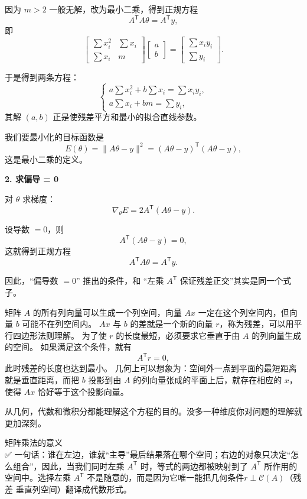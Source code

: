 因为 $m>2$ 一般无解，改为最小二乘，得到正规方程
\[
A^{\mathsf T}A\theta=A^{\mathsf T}y,
\]
即
\[
\begin{bmatrix}
\sum x_i^2 & \sum x_i \\
\sum x_i   & m
\end{bmatrix}
\begin{bmatrix}
a \\ b
\end{bmatrix}
=
\begin{bmatrix}
\sum x_i y_i \\
\sum y_i
\end{bmatrix}.
\]

于是得到两条方程：
\[
\begin{cases}
a\sum x_i^2 + b\sum x_i = \sum x_i y_i, \\[6pt]
a\sum x_i + b m = \sum y_i ,
\end{cases}
\]
其解 $(a,b)$ 正是使残差平方和最小的拟合直线参数。
\begin{proposition}[从矩阵理解和从导数理解的关系]
    我们要最小化的目标函数是
\[
E(\theta) = \|A\theta - y\|^2 = (A\theta - y)^{\mathsf T}(A\theta - y),
\]
这是最小二乘的定义。

\medskip

\textbf{2. 求偏导 = 0}

对 $\theta$ 求梯度：
\[
\nabla_\theta E = 2A^{\mathsf T}(A\theta - y).
\]

设导数 $=0$，则
\[
A^{\mathsf T}(A\theta - y) = 0,
\]
这就得到正规方程
\[
A^{\mathsf T}A \theta = A^{\mathsf T} y.
\]

因此，“偏导数 $=0$” 推出的条件，和 “左乘 $A^{\mathsf T}$ 保证残差正交”其实是同一个式子。
\end{proposition}
\begin{proposition}[如何从投影理解优化目标]
矩阵 $A$ 的所有列向量可以生成一个列空间，向量 $Ax$ 一定在这个列空间内，但向量 $b$ 可能不在列空间内。
$Ax$ 与 $b$ 的差就是一个新的向量 $r$，称为残差，可以用平行四边形法则理解。
为了使 $r$ 的长度最短，必须要求它垂直于由 $A$ 的列向量生成的空间。
如果满足这个条件，就有
\[
A^{\mathsf T} r = 0,
\]
此时残差的长度也达到最小。
几何上可以想象为：空间外一点到平面的最短距离就是垂直距离，而把 $b$ 投影到由 $A$ 的列向量张成的平面上后，就存在相应的 $x$，使得 $Ax$ 恰好等于这个投影向量。
\end{proposition}
\begin{dxtips}
    从几何，代数和微积分都能理解这个方程的目的。没多一种维度你对问题的理解就更加深刻。
\end{dxtips}
\begin{dxtips}
    

矩阵乘法的意义     \\
✅ 一句话：谁在左边，谁就“主导”最后结果落在哪个空间；右边的对象只决定“怎么组合”，因此，当我们同时左乘 $A^{\mathsf T}$ 时，等式的两边都被映射到了 
$A^{\mathsf T}$ 所作用的空间中。选择左乘 $A^{\mathsf T}$ 不是随意的，而是因为它唯一能把几何条件$r \perp \mathcal C(A)$（残差 垂直列空间）翻译成代数形式。
\end{dxtips}

